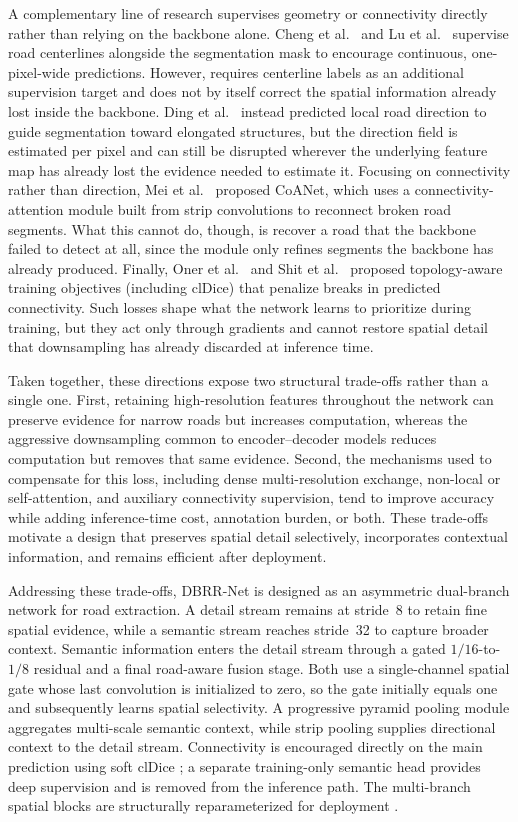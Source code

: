 \documentclass[a4paper,fleqn, review]{cas-sc}
\begin{document}
A complementary line of research supervises geometry or connectivity
directly rather than relying on the backbone alone. Cheng et
al.~\cite{cheng2017cascaded} and Lu et al.~\cite{lu2019msmtre} supervise
road centerlines alongside the segmentation mask to encourage continuous,
one-pixel-wide predictions. However, requires centerline labels as an
additional supervision target and does not by itself correct the spatial
information already lost inside the backbone. Ding et
al.~\cite{ding2021diresnet} instead predicted local road direction to guide
segmentation toward elongated structures, but the direction field is
estimated per pixel and can still be disrupted wherever the underlying
feature map has already lost the evidence needed to estimate it. Focusing
on connectivity rather than direction, Mei et al.~\cite{mei2021coanet}
proposed CoANet, which uses a connectivity-attention module built from strip
convolutions to reconnect broken road segments. What this cannot do,
though, is recover a road that the backbone failed to detect at all, since
the module only refines segments the backbone has already produced. Finally,
Oner et al.~\cite{oner2022connectivity} and Shit et
al.~\cite{shit2021cldice} proposed topology-aware training objectives
(including clDice) that penalize breaks in predicted connectivity. Such
losses shape what the network learns to prioritize during training, but
they act only through gradients and cannot restore spatial detail that
downsampling has already discarded at inference time.

Taken together, these directions expose two structural trade-offs rather
than a single one. First, retaining high-resolution features throughout the
network can preserve evidence for narrow roads but increases computation,
whereas the aggressive downsampling common to encoder--decoder models
reduces computation but removes that same evidence. Second, the mechanisms
used to compensate for this loss, including dense multi-resolution exchange,
non-local or self-attention, and auxiliary connectivity supervision, tend to
improve accuracy while adding inference-time cost, annotation burden, or
both. These trade-offs motivate a design that preserves spatial detail
selectively, incorporates contextual information, and remains efficient
after deployment.

Addressing these trade-offs, DBRR-Net is designed as an asymmetric dual-branch
network for road extraction. A detail stream remains at stride~8 to retain fine
spatial evidence, while a semantic stream reaches stride~32 to capture broader
context. Semantic information enters the detail stream through a gated
$1/16$-to-$1/8$ residual and a final road-aware fusion stage. Both use a
single-channel spatial gate whose last convolution is initialized to zero, so
the gate initially equals one and subsequently learns spatial selectivity. A
progressive pyramid pooling module aggregates multi-scale semantic context,
while strip pooling supplies directional context to the detail stream.
Connectivity is encouraged directly on the main prediction using soft clDice
\cite{shit2021cldice}; a separate training-only semantic head provides deep
supervision and is removed from the inference path. The multi-branch spatial
blocks are structurally reparameterized for deployment \cite{ding2021repvgg}.
\end{document}
